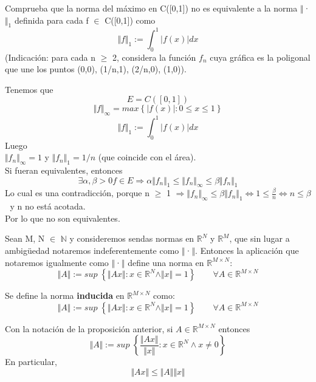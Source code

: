\begin{ejer}
Comprueba que la norma del máximo en C([0,1]) no es equivalente a la norma $\Vert$·$\Vert _1$ definida para cada f $\in$ C([0,1]) como
\[ \Vert f \Vert _1 := \int_0^1 \vert f(x) \vert dx \]
(Indicación: para cada n $\geq$ 2, considera la función $f_n$ cuya gráfica es la poligonal que une los puntos (0,0), (1/n,1), (2/n,0), (1,0)).
\end{ejer}

\begin{sol}
Tenemos que\\
\[ E = C([0,1]) \]
\[ \Vert f \Vert _\infty = max \left\lbrace \vert f(x) \vert : 0 \leq x \leq 1 \right\rbrace \]
\[ \Vert f \Vert _1 := \int_0^1 \vert f(x) \vert dx \]
Luego\\
$\Vert f_n \Vert _\infty = 1$ y $\Vert f_n \Vert _1 = 1/n$ (que coincide con el área).\\
Si fueran equivalentes, entonces
\[ \exists \alpha , \beta > 0 f \in E \Rightarrow \alpha \Vert f_n \Vert _1 \leq \Vert f_n \Vert _\infty \leq \beta \Vert f_n \Vert _1 \]
Lo cual es una contradicción, porque n $\geq$ 1 $\Rightarrow \Vert f_n \Vert _\infty \leq \beta \Vert f_n \Vert _1 \Leftrightarrow 1 \leq \frac{\beta}{n} \Leftrightarrow n \leq \beta$ $\;$ y n no está acotada.\\
Por lo que no son equivalentes.
\end{sol}

\begin{nprop}
Sean M, N $\in$ $\mathbb{N}$ y consideremos sendas normas en $\mathbb{R}^N$ y $\mathbb{R}^M$, que sin lugar a ambigüedad notaremos indeferentemente como $\Vert$·$\Vert$. Entonces la aplicación que notaremos igualmente como $\Vert$·$\Vert$ define una norma en $\mathbb{R}^{M \times N}$:
\[ \Vert A \Vert := sup \; \left\lbrace \Vert Ax \Vert : x \in \mathbb{R}^N \wedge \Vert x \Vert = 1 \right\rbrace \qquad \forall A \in \mathbb{R}^{M \times N} \]
\end{nprop}

\begin{ndef}
Se define la norma \textbf{inducida} en $\mathbb{R}^{M \times N}$ como:
\[ \Vert A \Vert := sup \; \left\lbrace \Vert Ax \Vert : x \in \mathbb{R}^N \wedge \Vert x \Vert = 1 \right\rbrace \qquad \forall A \in \mathbb{R}^{M \times N} \]
\end{ndef}

\begin{nprop}
Con la notación de la proposición anterior, si $A \in \mathbb{R}^{M \times N}$ entonces
\[ \Vert A \Vert := sup \; \left\lbrace \frac{\Vert Ax \Vert}{\Vert x \Vert } : x \in \mathbb{R}^N \wedge x \neq 0 \right\rbrace \]
En particular,
\[ \Vert Ax \Vert \leq \Vert A \Vert \Vert x \Vert \]
\end{nprop}

